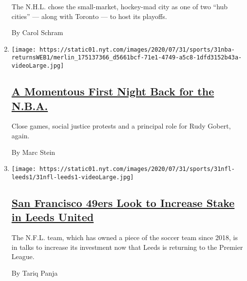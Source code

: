 \begin{enumerate}
  The N.H.L. chose the small-market, hockey-mad city as one of two ``hub
  cities'' --- along with Toronto --- to host its playoffs.

  By Carol Schram
\item
  \texttt{[image: https://static01.nyt.com/images/2020/07/31/sports/31nba-returnsWEB1/merlin\_175137366\_d5661bcf-71e1-4749-a5c8-1dfd3152b43a-videoLarge.jpg]}

  \hypertarget{a-momentous-first-night-back-for-the-nba}{%
  \subsection{\texorpdfstring{\href{/2020/07/31/sports/basketball/nba-opening-night.html}{A
  Momentous First Night Back for the
  N.B.A.}}{A Momentous First Night Back for the N.B.A.}}\label{a-momentous-first-night-back-for-the-nba}}

  Close games, social justice protests and a principal role for Rudy
  Gobert, again.

  By Marc Stein
\item
  \texttt{[image: https://static01.nyt.com/images/2020/07/31/sports/31nfl-leeds1/31nfl-leeds1-videoLarge.jpg]}

  \hypertarget{san-francisco-49ers-look-to-increase-stake-in-leeds-united}{%
  \subsection{\texorpdfstring{\href{/2020/07/31/sports/soccer/leeds-united-san-francisco-49ers.html}{San
  Francisco 49ers Look to Increase Stake in Leeds
  United}}{San Francisco 49ers Look to Increase Stake in Leeds United}}\label{san-francisco-49ers-look-to-increase-stake-in-leeds-united}}

  The N.F.L. team, which has owned a piece of the soccer team since
  2018, is in talks to increase its investment now that Leeds is
  returning to the Premier League.

  By Tariq Panja
\end{enumerate}

